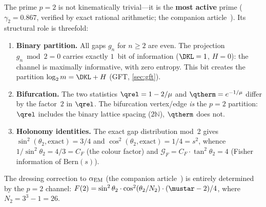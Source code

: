 \documentclass[12pt,a4paper]{article}
\begin{document}
\begin{remark}[The info/anti-info operator $p = 2$]
\label{rem:p2_operator}
The prime $p = 2$ is not kinematically trivial---it is the
\textbf{most active} prime ($\gamma_2 = 0.867$, verified by exact
rational arithmetic; the companion article~\cite{companion_M3}).
Its structural role is threefold:
\begin{enumerate}[nosep]
\item \textbf{Binary partition.} All gaps $g_n$ for $n \geq 2$ are even.
  The projection $g_n \bmod 2 = 0$ carries exactly $1$~bit of information
  ($\DKL = 1$, $H = 0$): the channel is maximally informative, with
  zero entropy. This bit creates the partition
  $\log_2 m = \DKL + H$ (GFT, \cref{sec:gft}).
\item \textbf{Bifurcation.} The two statistics
  $\qrel = 1 - 2/\mu$ and $\qtherm = e^{-1/\mu}$ differ by the
  factor~$2$ in $\qrel$. The bifurcation vertex/edge \emph{is}
  the $p = 2$ partition: $\qrel$ includes the binary lattice
  spacing ($2\mathbb{N}$), $\qtherm$ does not.
\item \textbf{Holonomy identities.} The exact gap distribution mod~2
  gives $\sin^2(\theta_2, \text{exact}) = 3/4$ and
  $\cos^2(\theta_2, \text{exact}) = 1/4 = s^2$, whence
  $1/\sin^2\theta_2 = 4/3 = C_F$ (the colour factor) and
  $\mathcal{G}_F = C_F \cdot \tan^2\theta_2 = 4$ (Fisher information
  of $\mathrm{Bern}(s)$).
\end{enumerate}
The dressing correction to $\alpha_{\rm EM}$
(the companion article~\cite{companion_M5}) is entirely determined by the $p = 2$
channel: $F(2) = \sin^2\theta_2 \cdot \cos^2(\theta_2/N_2)
\cdot (\mustar - 2)/4$, where $N_2 = 3^3 - 1 = 26$.
\end{remark}
\end{document}
